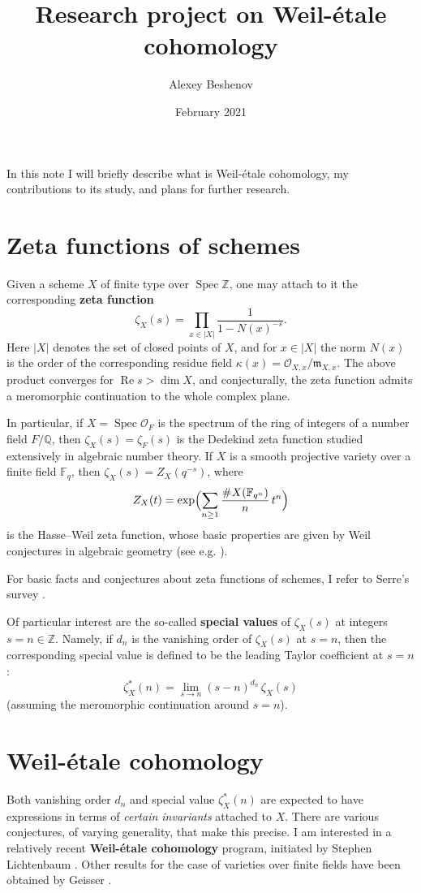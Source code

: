 \documentclass{article}
\author{Alexey Beshenov}
\date{February 2021}
\title{Research project on Weil-étale cohomology}
\DeclareMathOperator{\Spec}{Spec}
\newcommand{\ZZ}{\mathbb{Z}}
\newcommand{\FF}{\mathbb{F}}
\newcommand{\QQ}{\mathbb{Q}}
\renewcommand{\Re}{\operatorname{Re}}
\begin{document}
\maketitle

In this note I will briefly describe what is Weil-étale cohomology,
my contributions to its study, and plans for further research.

\section{Zeta functions of schemes}

Given a scheme $X$ of finite type over $\Spec \ZZ$, one may attach to it the
corresponding \textbf{zeta function}
$$\zeta_X (s) = \prod_{x \in |X|} \frac{1}{1 - N (x)^{-s}}.$$
Here $|X|$ denotes the set of closed points of $X$, and for $x \in |X|$ the norm
$N (x)$ is the order of the corresponding residue field
$\kappa (x) = \mathcal{O}_{X,x}/\mathfrak{m}_{X,x}$. The above product converges
for $\Re s > \dim X$, and conjecturally, the zeta function admits a meromorphic
continuation to the whole complex plane.

In particular, if $X = \Spec \mathcal{O}_F$ is the spectrum of the ring of
integers of a number field $F/\QQ$, then $\zeta_X (s) = \zeta_F (s)$ is the
Dedekind zeta function studied extensively in algebraic number theory. If $X$ is
a smooth projective variety over a finite field $\FF_q$, then
$\zeta_X (s) = Z_X (q^{-s})$, where
$$Z_X (t) = \exp \Bigl(\sum_{n\ge 1} \frac{\# X (\FF_{q^n})}{n}\,t^n\Bigr)$$
is the Hasse--Weil zeta function, whose basic properties are given by Weil
conjectures in algebraic geometry (see e.g. \cite{Katz-Motives}).

For basic facts and conjectures about zeta functions of schemes, I refer to
Serre's survey \cite{Serre-65}.

Of particular interest are the so-called \textbf{special values} of
$\zeta_X (s)$ at integers $s = n \in \ZZ$. Namely, if $d_n$ is the vanishing
order of $\zeta_X (s)$ at $s = n$, then the corresponding special value is
defined to be the leading Taylor coefficient at $s = n$:
$$\zeta_X^* (n) = \lim_{s \to n} (s - n)^{d_n}\,\zeta_X (s)$$
(assuming the meromorphic continuation around $s = n$).

\section{Weil-étale cohomology}

Both vanishing order $d_n$ and special value $\zeta_X^* (n)$ are expected to
have expressions in terms of \emph{certain invariants} attached to $X$. There
are various conjectures, of varying generality, that make this precise.  I am
interested in a relatively recent \textbf{Weil-étale cohomology} program,
initiated by Stephen Lichtenbaum
\cite{Lichtenbaum-05,Lichtenbaum-09-Euler,Lichtenbaum-09-number-rings}.  Other
results for the case of varieties over finite fields have been obtained by
Geisser \cite{Geisser-2004,Geisser-2006}.
\end{document}
